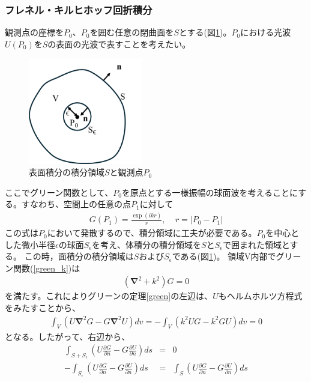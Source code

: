 \documentclass[a4paper,11pt,uplatex]{jsbook}
\begin{document}
\subsubsection{フレネル・キルヒホッフ回折積分}
観測点の座標を$P_0$、$P_0$を囲む任意の閉曲面を$S$とする(図\ref{diff_cord})。$P_0$における光波$U(P_0)$を$S$の表面の光波で表すことを考えたい。
\begin{figure}[h]
  \centering
  \includegraphics[width=5cm]{image/2-diffraction_cordinate.png}
  \caption[回折積分の座標系]{表面積分の積分領域$S$と観測点$P_0$}\label{diff_cord}
\end{figure}
ここでグリーン関数として、$P_0$を原点とする一様振幅の球面波を考えることにする。すなわち、空間上の任意の点$P_1$に対して
\begin{eqnarray}
  G(P_1) = \frac{\exp(ikr)}{r},~~~~~r = \left|P_0- P_1\right| \label{green_k}
\end{eqnarray}
この式は$P_0$において発散するので、積分領域に工夫が必要である。$P_0$を中心とした微小半径$\epsilon$の球面$S_\epsilon$を考え、体積分の積分領域を$S$と$S_\epsilon$で囲まれた領域とする。
この時，面積分の積分領域は$S$および$S_\epsilon$である(図\ref{diff_cord})。
領域V内部でグリーン関数(\ref{green_k})は
\begin{eqnarray}
  \left(\bm{\nabla}^2 + k^2\right)G = 0 
\end{eqnarray}
を満たす。これによりグリーンの定理\ref{green}の左辺は、$U$もヘルムホルツ方程式をみたすことから、
\begin{eqnarray}
  \int_V \left(U\bm{\nabla}^2G - G\bm{\nabla}^2U\right) dv =  - \int_V \left( k^2UG - k^2GU\right)dv  = 0
\end{eqnarray}
となる。したがって、右辺から、
\begin{eqnarray}
  \int_{S+S_\epsilon} \left( U\frac{\partial G}{\partial n} - G\frac{\partial U}{\partial n}\right)ds &=& 0\\
  -\int_{S_\epsilon} \left( U\frac{\partial G}{\partial n} - G\frac{\partial U}{\partial n}\right) ds &=& 
  \int_S \left( U\frac{\partial G}{\partial n} - G\frac{\partial U}{\partial n}\right) ds
\end{eqnarray}
\end{document}
